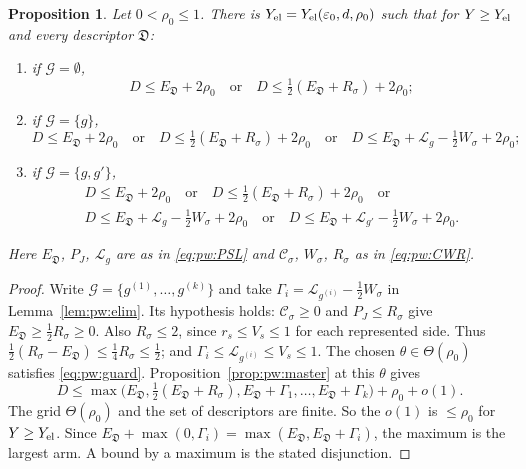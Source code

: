 \documentclass{amsart}
\newtheorem{proposition}[lemma]{Proposition}
\theoremstyle{definition}
\theoremstyle{plain}
\numberwithin{equation}{section}
\numberwithin{table}{section}
\begin{document}
\begin{proposition}\label{thm:pw:rows}
Let $0<\rho_0\le1$. There is $Y_{\rm el}=Y_{\rm el}(\varepsilon_0,d,\rho_0)$ such that for
$Y\ge Y_{\rm el}$ and every descriptor $\mathfrak D$:
\begin{enumerate}
\item[(a)] if $\mathcal G=\emptyset$,
\begin{equation}\label{eq:pw:POW3}
 D\le E_{\mathfrak D}+2\rho_0\quad\text{or}\quad D\le\tfrac12(E_{\mathfrak D}+R_\sigma)+2\rho_0;
\end{equation}
\item[(b)] if $\mathcal G=\{g\}$,
\begin{equation}\label{eq:pw:G12}
 D\le E_{\mathfrak D}+2\rho_0\quad\text{or}\quad D\le\tfrac12(E_{\mathfrak D}+R_\sigma)+2\rho_0
 \quad\text{or}\quad D\le E_{\mathfrak D}+\mathcal L_g-\tfrac12W_\sigma+2\rho_0;
\end{equation}
\item[(c)] if $\mathcal G=\{g,g'\}$,
\begin{equation}\label{eq:pw:G1212}
 \begin{gathered}
 D\le E_{\mathfrak D}+2\rho_0\quad\text{or}\quad D\le\tfrac12(E_{\mathfrak D}+R_\sigma)+2\rho_0\quad\text{or}\\
 D\le E_{\mathfrak D}+\mathcal L_g-\tfrac12W_\sigma+2\rho_0\quad\text{or}\quad
 D\le E_{\mathfrak D}+\mathcal L_{g'}-\tfrac12W_\sigma+2\rho_0 .
 \end{gathered}
\end{equation}
\end{enumerate}
Here $E_{\mathfrak D}$, $P_J$, $\mathcal L_g$ are as in \eqref{eq:pw:PSL} and $\mathcal C_\sigma$, $W_\sigma$,
$R_\sigma$ as in \eqref{eq:pw:CWR}.
\end{proposition}

\begin{proof}
Write $\mathcal G=\{g^{(1)},\dots,g^{(k)}\}$ and take
$\Gamma_i=\mathcal L_{g^{(i)}}-\frac12W_\sigma$ in Lemma~\ref{lem:pw:elim}. Its hypothesis
holds: $\mathcal C_\sigma\ge0$ and $P_J\le R_\sigma$ give
$E_{\mathfrak D}\ge\frac12R_\sigma\ge0$. Also $R_\sigma\le2$, since
$r_s\le V_s\le1$ for each represented side. Thus
$\frac12(R_\sigma-E_{\mathfrak D})\le\frac14R_\sigma\le\frac12$; and
 $\Gamma_i\le\mathcal L_{g^{(i)}}\le V_s\le1$. The chosen $\theta\in\Theta(\rho_0)$ satisfies
\eqref{eq:pw:guard}. Proposition~\ref{prop:pw:master} at this $\theta$ gives
\[
 D\le\max\bigl(E_{\mathfrak D},\tfrac12(E_{\mathfrak D}+R_\sigma),E_{\mathfrak D}+\Gamma_1,\dots,E_{\mathfrak D}+\Gamma_k\bigr)+\rho_0+o(1).
\]
The grid $\Theta(\rho_0)$ and the set of descriptors are finite. So the
$o(1)$ is $\le\rho_0$ for $Y\ge Y_{\rm el}$. Since
$E_{\mathfrak D}+\max(0,\Gamma_i)=\max(E_{\mathfrak D},E_{\mathfrak D}+\Gamma_i)$, the
maximum is the largest arm. A bound by a maximum is the stated disjunction.
\end{proof}
\end{document}
